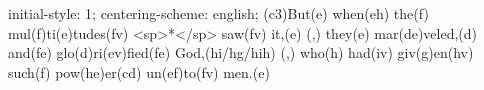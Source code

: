 initial-style: 1;
centering-scheme: english;
(c3)But(e) when(eh) the(f) mul(f)ti(e)tudes(fv) <sp>*</sp> saw(fv) it,(e) (,) they(e) mar(de)veled,(d) and(fe) glo(d)ri(ev)fied(fe) God,(hi/hg/hih) (,) who(h) had(iv) giv(g)en(hv) such(f) pow(he)er(cd) un(ef)to(fv) men.(e)
